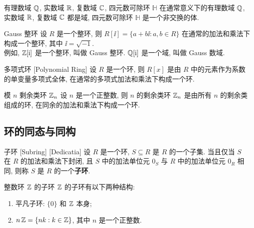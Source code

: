         \begin{ins}
            {有理数域 \(\operatorname{\mathbb{Q}}\), 实数域 \(\operatorname{\mathbb{R}}\), 复数域 \(\operatorname{\mathbb{C}}\), 四元数可除环 \(\mathbb{H}\)}
            在通常意义下的有理数域 \(\operatorname{\mathbb{Q}}\), 实数域 \(\operatorname{\mathbb{R}}\), 复数域 \(\operatorname{\mathbb{C}}\) 都是域, 四元数可除环 \(\mathbb{H}\) 是一个非交换的体.
        \end{ins}

        \begin{ins}
            {Gauss 整环}
            设 \(R\) 是一个整环, 则 \(R[\ii]=\{a+b\ii: a,b\in R\}\) 在通常的加法和乘法下构成一个整环, 其中 \(\ii=\sqrt{-1}\). \\
            例如, \(\operatorname{\mathbb{Z}}[\operatorname{\mathrm{i}}]\) 是一个整环, 叫做 Gauss 整环. \(\operatorname{\mathbb{Q}}[\operatorname{\mathrm{i}}]\) 是一个域, 叫做 Gauss 数域.
        \end{ins}

        \begin{ins}
            {多项式环}
            [Polynomial Ring]
            设 \(R\) 是一个环, 则 \(R[x]\) 是由 \(R\) 中的元素作为系数的单变量多项式全体, 在通常的多项式加法和乘法下构成一个环.
        \end{ins}

        \begin{ins}
            {模 \(n\) 剩余类环 \(\operatorname{\mathbb{Z}}_n\)}
            设 \(n\) 是一个正整数, 则 \(n\) 的剩余类环 \(\operatorname{\mathbb{Z}}_n\) 是由所有 \(n\) 的剩余类组成的环, 在同余的加法和乘法下构成一个环.
        \end{ins}

    \subsection{环的同态与同构}

        \begin{dfn}
            {子环}
            [Subring]
            [Dedicatia]
            设 \(R\) 是一个环, \(S\subseteq R\) 是 \(R\) 的一个子集. 当且仅当 \(S\) 在 \(R\) 的加法和乘法下封闭, 且 \(S\) 中的加法单位元 \(0_S\) 与 \(R\) 中的加法单位元 \(0_R\) 相同, 则称 \(S\) 是 \(R\) 的一个\textbf{子环}.
        \end{dfn}

        \begin{ins}
            {整数环 \(\operatorname{\mathbb{Z}}\) 的子环}
            \(\operatorname{\mathbb{Z}}\) 的子环有以下两种结构:
            \begin{enumerate}
                \item 平凡子环: \(\{0\}\) 和 \(\operatorname{\mathbb{Z}}\) 本身;
                \item \(n\operatorname{\mathbb{Z}}=\{nk: k\in\operatorname{\mathbb{Z}}\}\), 其中 \(n\) 是一个正整数.
            \end{enumerate}
        \end{ins}

